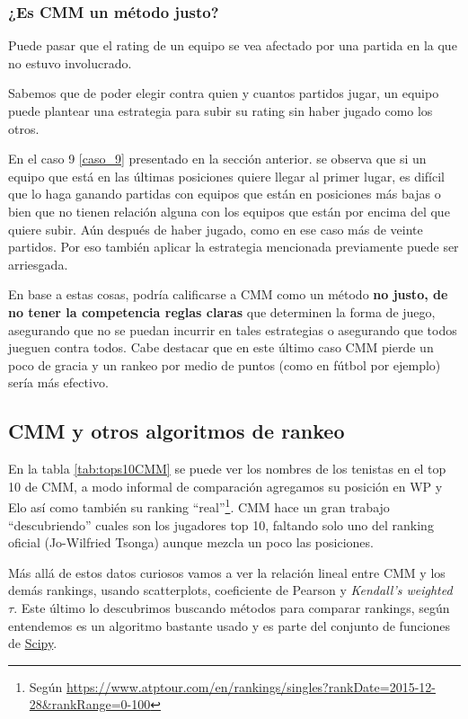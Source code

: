 \subsubsection{¿Es CMM un método justo?}

Puede pasar que el rating de un equipo se vea afectado por una partida en la que no estuvo involucrado.

Sabemos que de poder elegir contra quien y cuantos partidos jugar, un equipo puede plantear una estrategia para subir su rating sin haber jugado como los otros.

En el caso 9 \ref{caso_9} presentado en la sección anterior. se observa que si un equipo que está en las últimas posiciones quiere llegar al primer lugar, es difícil que lo haga ganando partidas con equipos que están en posiciones más bajas o bien que no tienen relación alguna con los equipos que están por encima del que quiere subir. Aún después de haber jugado, como en ese caso más de veinte partidos. Por eso también aplicar la estrategia mencionada previamente puede ser arriesgada.

En base a estas cosas, podría calificarse a CMM como un método \textbf{no  justo, de no tener la competencia reglas claras} que determinen la forma de juego, asegurando que no se puedan incurrir en tales estrategias o asegurando que todos jueguen contra todos. Cabe destacar que en este último caso CMM pierde un poco de gracia y un rankeo por medio de puntos (como en fútbol por ejemplo) sería más efectivo.

\FloatBarrier
\subsection{CMM y otros algoritmos de rankeo}
En la tabla \ref{tab:tops10CMM} se puede ver los nombres de los tenistas en el top 10 de CMM, a modo informal de comparación agregamos su posición en WP y Elo así como también su ranking ``real''\footnote{Según \url{https://www.atptour.com/en/rankings/singles?rankDate=2015-12-28&rankRange=0-100}}. CMM hace un gran trabajo ``descubriendo'' cuales son los jugadores top 10, faltando solo uno del ranking oficial (Jo-Wilfried Tsonga) aunque mezcla un poco las posiciones.



Más allá de estos datos curiosos vamos a ver la relación lineal entre CMM y los demás rankings, usando scatterplots, coeficiente de Pearson y \textit{Kendall’s weighted $\tau$}. Este último lo descubrimos buscando métodos para comparar rankings, según entendemos es un algoritmo bastante usado y es parte del conjunto de funciones de \href{https://docs.scipy.org/doc/scipy/reference/generated/scipy.stats.weightedtau.html}{Scipy}.

